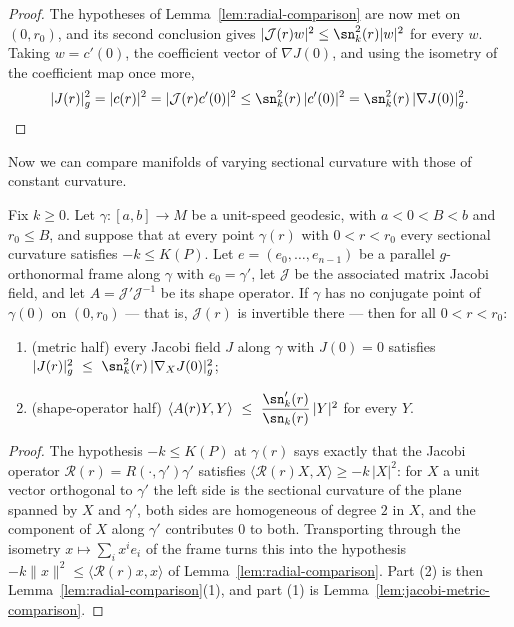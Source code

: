 \begin{proof}
The hypotheses of Lemma~\ref{lem:radial-comparison} are now met on $(0,r_0)$, and
its second conclusion gives $|\mathcal J(r)w|^2\le\sn_k^2(r)|w|^2$ for every $w$.
Taking $w=c'(0)$, the coefficient vector of $\nabla J(0)$, and using the isometry
of the coefficient map once more,
$$|J(r)|_g^2=|c(r)|^2=|\mathcal J(r)c'(0)|^2\le\sn_k^2(r)\,|c'(0)|^2
=\sn_k^2(r)\,|\nabla J(0)|_g^2 . \qedhere$$
\end{proof}

Now we can compare manifolds of varying sectional curvature with
those of constant curvature.


\begin{lemma}
\label{lem:frame-sectional-comparison}
\leanok
Fix $k\ge0$. Let $\gamma\colon[a,b]\to M$ be a unit-speed geodesic, with
$a<0<B<b$ and $r_0\le B$, and suppose that at every point $\gamma(r)$ with
$0<r<r_0$ every sectional curvature satisfies $-k\le K(P)$. Let
$e=(e_0,\ldots,e_{n-1})$ be a parallel $g$-orthonormal frame along $\gamma$
with $e_0=\gamma'$, let $\mathcal J$ be the associated matrix Jacobi field,
and let $A=\mathcal J'\mathcal J^{-1}$ be its shape operator. If $\gamma$ has
no conjugate point of $\gamma(0)$ on $(0,r_0)$ --- that is, $\mathcal J(r)$ is
invertible there --- then for all $0<r<r_0$:
\begin{enumerate}
\item (metric half) every Jacobi field $J$ along $\gamma$ with $J(0)=0$
satisfies $|J(r)|_g^2\ \le\ \sn_k^2(r)\,|\nabla_XJ(0)|_g^2$;
\item (shape-operator half)
$\langle A(r)Y,Y\rangle\ \le\ \dfrac{\sn_k'(r)}{\sn_k(r)}\,|Y|^2$ for every $Y$.
\end{enumerate}
\end{lemma}

\begin{proof}
\leanok
The hypothesis $-k\le K(P)$ at $\gamma(r)$ says exactly that the Jacobi operator
$\mathcal R(r)=R(\cdot,\gamma')\gamma'$ satisfies
$\langle\mathcal R(r)X,X\rangle\ge-k\,|X|^2$: for $X$ a unit vector orthogonal to
$\gamma'$ the left side is the sectional curvature of the plane spanned by $X$ and
$\gamma'$, both sides are homogeneous of degree $2$ in $X$, and the component of
$X$ along $\gamma'$ contributes $0$ to both. Transporting through the isometry
$x\mapsto\sum_ix^ie_i$ of the frame turns this into the hypothesis
$-k\|x\|^2\le\langle\mathcal R(r)x,x\rangle$ of
Lemma~\ref{lem:radial-comparison}. Part (2) is then
Lemma~\ref{lem:radial-comparison}(1), and part (1) is
Lemma~\ref{lem:jacobi-metric-comparison}.
\end{proof}

